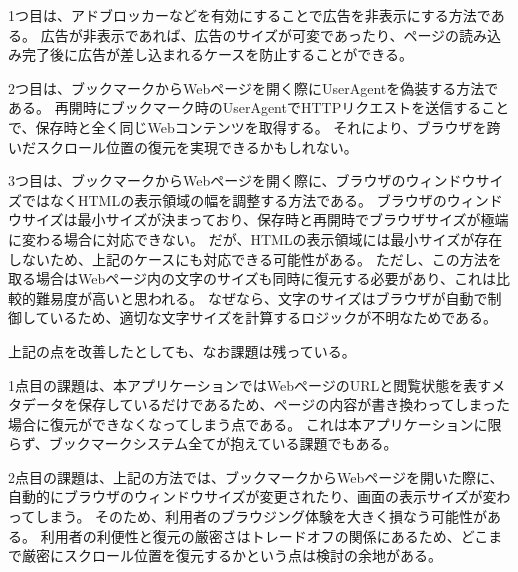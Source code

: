 1つ目は、アドブロッカーなどを有効にすることで広告を非表示にする方法である。
広告が非表示であれば、広告のサイズが可変であったり、ページの読み込み完了後に広告が差し込まれるケースを防止することができる。

2つ目は、ブックマークからWebページを開く際にUserAgentを偽装する方法である。
再開時にブックマーク時のUserAgentでHTTPリクエストを送信することで、保存時と全く同じWebコンテンツを取得する。
それにより、ブラウザを跨いだスクロール位置の復元を実現できるかもしれない。

3つ目は、ブックマークからWebページを開く際に、ブラウザのウィンドウサイズではなくHTMLの表示領域の幅を調整する方法である。
ブラウザのウィンドウサイズは最小サイズが決まっており、保存時と再開時でブラウザサイズが極端に変わる場合に対応できない。
だが、HTMLの表示領域には最小サイズが存在しないため、上記のケースにも対応できる可能性がある。
ただし、この方法を取る場合はWebページ内の文字のサイズも同時に復元する必要があり、これは比較的難易度が高いと思われる。
なぜなら、文字のサイズはブラウザが自動で制御しているため、適切な文字サイズを計算するロジックが不明なためである。

上記の点を改善したとしても、なお課題は残っている。

1点目の課題は、本アプリケーションではWebページのURLと閲覧状態を表すメタデータを保存しているだけであるため、ページの内容が書き換わってしまった場合に復元ができなくなってしまう点である。
これは本アプリケーションに限らず、ブックマークシステム全てが抱えている課題でもある。

2点目の課題は、上記の方法では、ブックマークからWebページを開いた際に、自動的にブラウザのウィンドウサイズが変更されたり、画面の表示サイズが変わってしまう。
そのため、利用者のブラウジング体験を大きく損なう可能性がある。
利用者の利便性と復元の厳密さはトレードオフの関係にあるため、どこまで厳密にスクロール位置を復元するかという点は検討の余地がある。